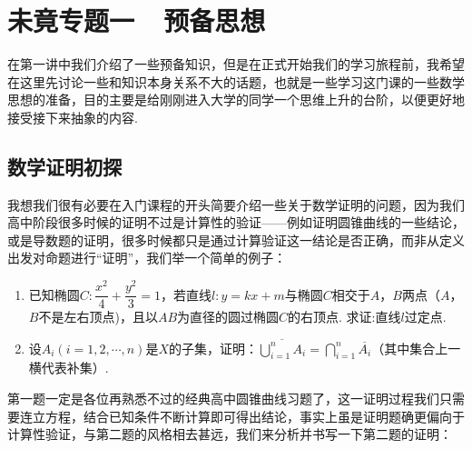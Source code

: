 \chapter*{未竟专题一\  \ 预备思想}

在第一讲中我们介绍了一些预备知识，但是在正式开始我们的学习旅程前，我希望在这里先讨论一些和知识本身关系不大的话题，也就是一些学习这门课的一些数学思想的准备，目的主要是给刚刚进入大学的同学一个思维上升的台阶，以便更好地接受接下来抽象的内容.

\section*{数学证明初探}

我想我们很有必要在入门课程的开头简要介绍一些关于数学证明的问题，因为我们高中阶段很多时候的证明不过是计算性的验证——例如证明圆锥曲线的一些结论，或是导数题的证明，很多时候都只是通过计算验证这一结论是否正确，而非从定义出发对命题进行``证明''，我们举一个简单的例子：

\begin{example*}
    \begin{enumerate}
        \item 已知椭圆$C:\dfrac{x^2}{4}+\dfrac{y^2}{3}=1$，若直线$l:y=kx+m$与椭圆$C$相交于$A$，$B$两点（$A$，$B$不是左右顶点)，且以$AB$为直径的圆过椭圆$C$的右顶点. 求证:直线$l$过定点.

        \item 设$A_i(i=1,2,\cdots,n)$是$X$的子集，证明：$\overline{\bigcup\limits_{i=1}^nA_i}=\bigcap\limits_{i=1}^n\overline{A_i}$（其中集合上一横代表补集）.
    \end{enumerate}
\end{example*}

第一题一定是各位再熟悉不过的经典高中圆锥曲线习题了，这一证明过程我们只需要连立方程，结合已知条件不断计算即可得出结论，事实上虽是证明题确更偏向于计算性验证，与第二题的风格相去甚远，我们来分析并书写一下第二题的证明：

